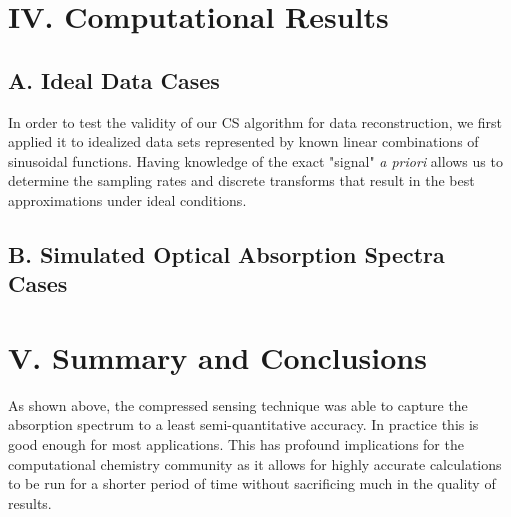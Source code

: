 \documentclass[11pt]{article}
\begin{document}
\section*{IV.	Computational Results} %


\subsection*{A.	Ideal Data Cases}
In order to test the validity of our CS algorithm for data reconstruction, we first applied it to idealized data sets represented by known linear combinations of sinusoidal functions. Having knowledge of the exact "signal" \emph{a priori} allows us to determine the sampling rates and discrete transforms that result in the best approximations under ideal conditions. 



\subsection*{B.	Simulated Optical Absorption Spectra Cases}





\section*{V.	Summary and Conclusions} %

\par As shown above, the compressed sensing technique was able to capture the absorption spectrum to a least semi-quantitative accuracy. In practice this is good enough for most applications. This has profound implications for the computational chemistry community as it allows for highly accurate calculations to be run for a shorter period of time without sacrificing much in the quality of results.\\ 
\end{document}
